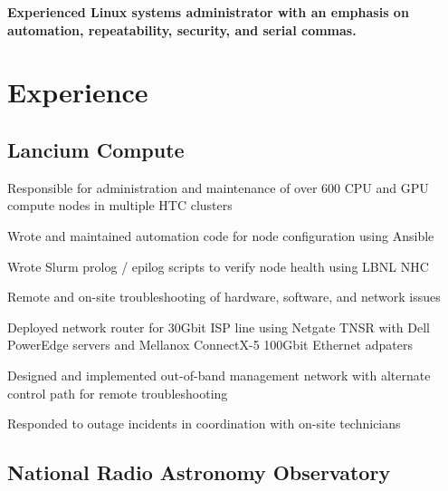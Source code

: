 \documentclass[letterpaper]{deedy-resume-openfont}
\begin{document}
\begin{minipage}[t]{0.69\textwidth} %
\vspace{3pt}
\newcommand{\summary}[1]{ %
\raggedright\bfseries { #1 \\}
\hrulefill
}

\summary{Experienced Linux systems administrator with an emphasis on automation, repeatability, security, and serial commas.} 

\section{Experience}

\subsection{Lancium Compute}

\begin{tightemize}
	\item Responsible for administration and maintenance of over 600 CPU and GPU compute nodes in multiple HTC clusters
	\item Wrote and maintained automation code for node configuration using Ansible
	\item Wrote Slurm prolog / epilog scripts to verify node health using LBNL NHC
	\item Remote and on-site troubleshooting of hardware, software, and network issues
	\item Deployed network router for 30Gbit ISP line using Netgate TNSR with Dell PowerEdge servers and Mellanox ConnectX-5 100Gbit Ethernet adpaters
	\item Designed and implemented out-of-band management network with alternate control path for remote troubleshooting
	\item Responded to outage incidents in coordination with on-site technicians
\end{tightemize}
\vspace{6pt}

\subsection{National Radio Astronomy Observatory}


\end{minipage}
\end{document}
